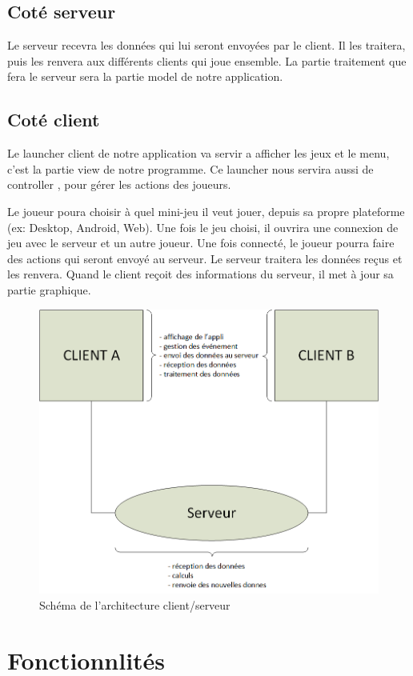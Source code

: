 \documentclass{report}
\begin{document}
\section{Coté serveur}
Le serveur recevra les données qui lui seront envoyées par le client. Il les traitera, puis les renvera aux différents clients qui joue ensemble. La partie traitement que fera le serveur
sera la partie \og model \fg{} de notre application.
\section{Coté client}
Le launcher client de notre application va servir a afficher les jeux et le menu, c'est la partie \og view \fg{} de notre programme. Ce launcher nous servira aussi de \og controller \fg{}, pour gérer
les actions des joueurs.\par
Le joueur poura choisir à quel mini-jeu il veut jouer, depuis sa propre plateforme (ex: Desktop, Android, Web). Une fois le jeu choisi, il ouvrira une connexion de jeu avec le serveur et un autre joueur.
Une fois connecté, le joueur pourra faire des actions qui seront envoyé au serveur. Le serveur traitera les données reçus et les renvera. Quand le client reçoit des informations du serveur, il met à jour
sa partie graphique.
\begin{figure}[ht]
	\centering\includegraphics[width=12cm]{maquette_base}
	\caption{Schéma de l'architecture client/serveur}
	\label{schema-architecture}
\end{figure}
\chapter{Fonctionnlités}
\end{document}
